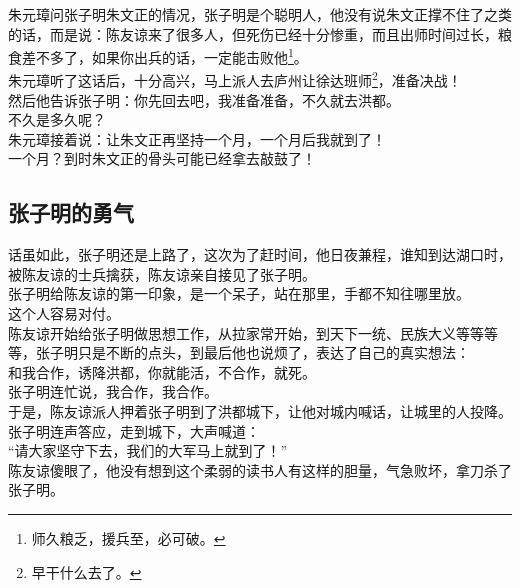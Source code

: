 \begin{multicols}{\theparacolNo}
朱元璋问张子明朱文正的情况，张子明是个聪明人，他没有说朱文正撑不住了之类的话，而是说：陈友谅来了很多人，但死伤已经十分惨重，而且出师时间过长，粮食差不多了，如果你出兵的话，一定能击败他\footnote{师久粮乏，援兵至，必可破。}。\\

朱元璋听了这话后，十分高兴，马上派人去庐州让徐达班师\footnote{早干什么去了。}，准备决战！\\

然后他告诉张子明：你先回去吧，我准备准备，不久就去洪都。\\

不久是多久呢？\\

朱元璋接着说：让朱文正再坚持一个月，一个月后我就到了！\\

一个月？到时朱文正的骨头可能已经拿去敲鼓了！\\

\subsection{张子明的勇气}
话虽如此，张子明还是上路了，这次为了赶时间，他日夜兼程，谁知到达湖口时，被陈友谅的士兵擒获，陈友谅亲自接见了张子明。\\

张子明给陈友谅的第一印象，是一个呆子，站在那里，手都不知往哪里放。\\

这个人容易对付。\\

陈友谅开始给张子明做思想工作，从拉家常开始，到天下一统、民族大义等等等等，张子明只是不断的点头，到最后他也说烦了，表达了自己的真实想法：\\

和我合作，诱降洪都，你就能活，不合作，就死。\\

张子明连忙说，我合作，我合作。\\

于是，陈友谅派人押着张子明到了洪都城下，让他对城内喊话，让城里的人投降。\\

张子明连声答应，走到城下，大声喊道：\\

“请大家坚守下去，我们的大军马上就到了！”\\

陈友谅傻眼了，他没有想到这个柔弱的读书人有这样的胆量，气急败坏，拿刀杀了张子明。\\


\end{multicols}

